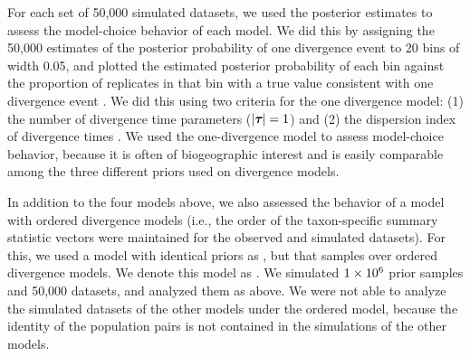 For each set of 50,000 simulated datasets, we used the posterior estimates
to assess the model-choice behavior of each model.
We did this by assigning the 50,000 estimates of the posterior probability
of one divergence event to 20 bins of width 0.05, and plotted
the estimated posterior probability of each bin against the proportion of
replicates in that bin with a true value consistent with one divergence
event \citep{Huelsenbeck2004,Oaks2012}.
We did this using two criteria for the one divergence model:
(1) the number of divergence time parameters ($\lvert \boldsymbol{\tau_{}} \rvert = 1$) and
(2) the dispersion index of divergence times \citep[$\divTimeDispersion <
0.01$][]{Hickerson2006,Huang2011}.
We used the one-divergence model to assess model-choice behavior, because
it is often of biogeographic interest and is easily comparable among
the three different priors used on divergence models.

In addition to the four models above, we also assessed the behavior of a model
with ordered divergence models (i.e., the order of the taxon-specific summary
statistic vectors were maintained for the observed and simulated datasets).
For this, we used a model with identical priors as \modelDPP, but that samples
over ordered divergence models.
We denote this model as \modelDPPOrdered.
We simulated $1\times 10^{6}$ prior samples and 50,000 datasets, and
analyzed them as above.
We were not able to analyze the simulated datasets of the other models under
the ordered model, because the identity of the population pairs is not
contained in the simulations of the other models.

